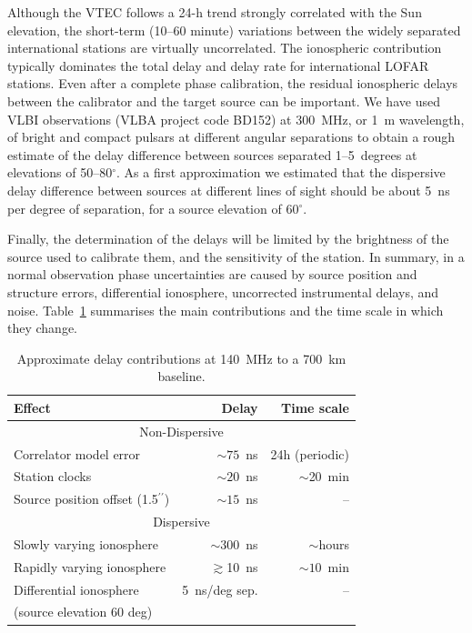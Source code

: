 \documentclass[graybox]{svmult}
\begin{document}
Although the VTEC follows a 24-h trend strongly correlated with the Sun
elevation, the short-term (10--60 minute) variations between the widely
separated international stations are virtually uncorrelated.  The ionospheric
contribution typically dominates the total delay and delay rate for
international LOFAR stations. Even after a complete phase calibration, the
residual ionospheric delays between the calibrator and the target source can be
important. We have used VLBI observations (VLBA project code BD152) at 300~MHz,
or 1~m wavelength, of bright and compact pulsars at different angular
separations to obtain a rough estimate of the delay difference between sources
separated 1--5~degrees at elevations of 50--80$^{\circ}$. As a first
approximation we estimated that the dispersive delay difference between sources
at different lines of sight should be about 5~ns per degree of separation, for
a source elevation of 60$^{\circ}$.

Finally, the determination of the delays will be limited by the brightness of
the source used to calibrate them, and the sensitivity of the station. In
summary, in a normal observation phase uncertainties are caused by source
position and structure errors, differential ionosphere, uncorrected
instrumental delays, and noise. Table~\ref{tab:expecteddelay} summarises the
main contributions and the time scale in which they change. 

\begin{table}
\caption{Approximate delay contributions at 140~MHz to a 700~km baseline.}             %
\label{tab:expecteddelay}
\centering
\begin{tabular}{l r r}
\hline\hline
Effect  & Delay  & Time scale \\
\hline
     \multicolumn{3}{c}{Non-Dispersive}   \\
\hline
Correlator model error      & $\sim75$~ns         &  24h (periodic)   \\
Station clocks              & $\sim20$~ns        & $\sim$20~min \\
Source position offset (1.5$^{\prime\prime}$)        & $\sim15$~ns        & --  \\
\hline
     \multicolumn{3}{c}{Dispersive}   \\
\hline
Slowly varying ionosphere   & $\sim300$~ns      & $\sim$hours \\
Rapidly varying ionosphere  & $\gtrsim$10~ns         & $\sim10$~min  \\
Differential ionosphere     & 5~ns/deg sep.      & -- \\
(source elevation 60 deg)   &                    &  \\

\hline                                   %
\end{tabular}
\end{table}
%
\end{document}
